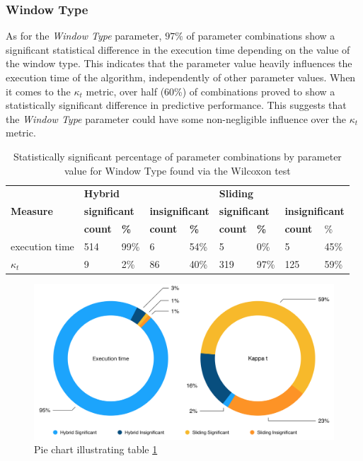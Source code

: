 \subsubsection{Window Type}
As for the \textit{Window Type} parameter, $97\%$ of parameter combinations show a significant statistical difference in the execution time depending on the value of the window type. This indicates that the parameter value heavily influences the execution time of the algorithm, independently of other parameter values. When it comes to the $\kappa_t$ metric, over half (60\%) of combinations proved to show a statistically significant difference in predictive performance. This suggests that the \textit{Window Type} parameter could have some non-negligible influence over the $\kappa_t$ metric.

\begin{table}[]
\centering
\caption{\label{table:wilcoxon_window_type}Statistically significant percentage of parameter combinations by parameter value for Window Type found via the Wilcoxon test}
\begin{tabular}{|l|l|l|l|l|l|l|l|l|}
\hline
\multirow{3}{*}{\textbf{Measure}} & \multicolumn{4}{l|}{\textbf{Hybrid}} & \multicolumn{4}{l|}{\textbf{Sliding}} \\ \cline{2-9} 
 & \multicolumn{2}{l|}{\textbf{significant}} & \multicolumn{2}{l|}{\textbf{insignificant}} & \multicolumn{2}{l|}{\textbf{significant}} & \multicolumn{2}{l|}{\textbf{insignificant}} \\ \cline{2-9} 
 & \textbf{count} & \textbf{\%} & \textbf{count} & \textbf{\%} & \textbf{count} & \textbf{\%} & \textbf{count} & \% \\ \hline \hhline{=========}
execution time & 514 & 99\% & 6 & 54\% & 5 & 0\% & 5 & 45\% \\ \hline
$\kappa_t$ & 9 & 2\% & 86 & 40\% & 319 & 97\% & 125 & 59\% \\ \hline
\end{tabular}
\end{table}


\begin{figure}
  \includegraphics[width=\linewidth]{./images/chapter5/wilcoxon_window_type_pie}
\caption{\label{fig:wilcoxon_window_type_pie}Pie chart illustrating table \ref{table:wilcoxon_window_type}}
\end{figure}


